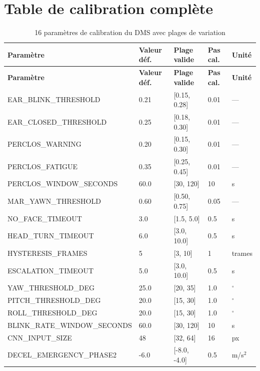\documentclass[12pt,a4paper]{report}
\newcommand{\degr}{\ensuremath{^{\circ}}}
\begin{document}
\clearpage

\chapter{Table de calibration compl\`ete}

\begin{longtable}{L{5.5cm} C{2cm} C{2.5cm} C{2cm} L{1.5cm}}
\caption{16 param\`etres de calibration du DMS avec plages de variation}
\label{tab:calib_full} \\
\toprule
\textbf{Param\`etre} & \textbf{Valeur d\'ef.} & \textbf{Plage valide} & \textbf{Pas cal.} & \textbf{Unit\'e} \\
\midrule
\endfirsthead
\toprule \textbf{Param\`etre} & \textbf{Valeur d\'ef.} & \textbf{Plage valide} & \textbf{Pas cal.} & \textbf{Unit\'e} \\
\midrule \endhead \bottomrule \endfoot
EAR\_BLINK\_THRESHOLD & 0.21 & [0.15, 0.28] & 0.01 & --- \\
EAR\_CLOSED\_THRESHOLD & 0.25 & [0.18, 0.30] & 0.01 & --- \\
PERCLOS\_WARNING & 0.20 & [0.15, 0.30] & 0.01 & --- \\
PERCLOS\_FATIGUE & 0.35 & [0.25, 0.45] & 0.01 & --- \\
PERCLOS\_WINDOW\_SECONDS & 60.0 & [30, 120] & 10 & s \\
MAR\_YAWN\_THRESHOLD & 0.60 & [0.50, 0.75] & 0.05 & --- \\
NO\_FACE\_TIMEOUT & 3.0 & [1.5, 5.0] & 0.5 & s \\
HEAD\_TURN\_TIMEOUT & 6.0 & [3.0, 10.0] & 0.5 & s \\
HYSTERESIS\_FRAMES & 5 & [3, 10] & 1 & trames \\
ESCALATION\_TIMEOUT & 5.0 & [3.0, 10.0] & 0.5 & s \\
YAW\_THRESHOLD\_DEG & 25.0 & [20, 35] & 1.0 & \degr \\
PITCH\_THRESHOLD\_DEG & 20.0 & [15, 30] & 1.0 & \degr \\
ROLL\_THRESHOLD\_DEG & 20.0 & [15, 30] & 1.0 & \degr \\
BLINK\_RATE\_WINDOW\_SECONDS & 60.0 & [30, 120] & 10 & s \\
CNN\_INPUT\_SIZE & 48 & [32, 64] & 16 & px \\
DECEL\_EMERGENCY\_PHASE2 & -6.0 & [-8.0, -4.0] & 0.5 & m/s$^2$ \\
\bottomrule
\end{longtable}
\end{document}
